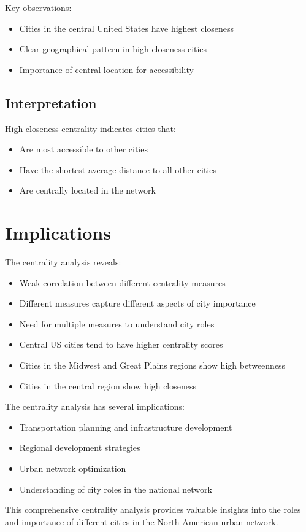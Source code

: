 Key observations:
\begin{itemize}
    \item Cities in the central United States have highest closeness
    \item Clear geographical pattern in high-closeness cities
    \item Importance of central location for accessibility
\end{itemize}

\subsection{Interpretation}
High closeness centrality indicates cities that:
\begin{itemize}
    \item Are most accessible to other cities
    \item Have the shortest average distance to all other cities
    \item Are centrally located in the network
\end{itemize}


\section{Implications}

The centrality analysis reveals:
\begin{itemize}
    \item Weak correlation between different centrality measures
    \item Different measures capture different aspects of city importance
    \item Need for multiple measures to understand city roles
    \item Central US cities tend to have higher centrality scores
    \item Cities in the Midwest and Great Plains regions show high betweenness
    \item Cities in the central region show high closeness
\end{itemize}


The centrality analysis has several implications:
\begin{itemize}
    \item Transportation planning and infrastructure development
    \item Regional development strategies
    \item Urban network optimization
    \item Understanding of city roles in the national network
\end{itemize}

This comprehensive centrality analysis provides valuable insights into the roles and importance of different cities in the North American urban network. 